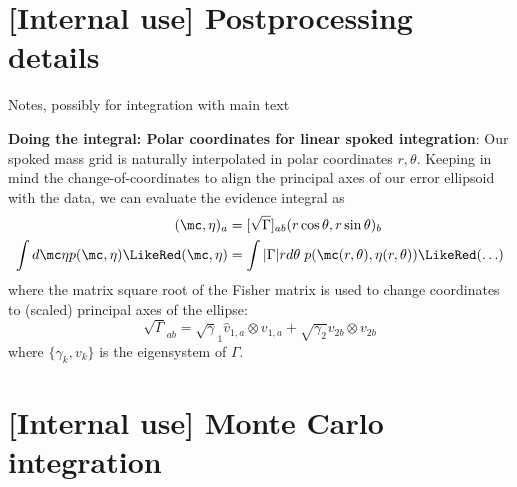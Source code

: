 \section{[Internal use] Postprocessing details}
Notes, possibly for integration with main text
\begin{widetext}

\noindent \textbf{Doing the integral: Polar coordinates for linear spoked integration}: Our spoked mass grid is
naturally interpolated in polar coordinates $r,\theta$.  Keeping in mind the change-of-coordinates to align the
principal axes of our error ellipsoid with the data, we can evaluate the evidence integral as 
\begin{align}
(\mc,\eta)_a &= [\sqrt{\Gamma}]_{ab}  (r\cos \theta,r\sin \theta)_b \\
\int d\mc \eta p(\mc,\eta) \LikeRed(\mc,\eta) &= \int |\Gamma| r d\theta \; p(\mc(r,\theta),\eta(r, \theta)) \LikeRed(\ldots)
\end{align}
where the matrix square root of the Fisher matrix is used to change coordinates to (scaled) principal axes of the ellipse:
\[
\sqrt{\Gamma}_{ab} = \sqrt{\gamma}_1 \hat{v}_{1,a}\otimes v_{1,a} + \sqrt{\gamma_2} v_{2b}\otimes v_{2b}
\]
where $\{\gamma_k,v_k\}$ is the eigensystem of $\Gamma$.

\end{widetext}


\section{[Internal use] Monte Carlo integration}

